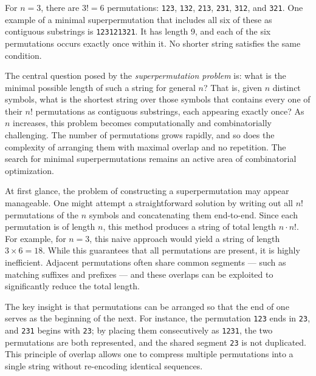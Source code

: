 For $n = 3$, there are $3! = 6$ permutations: \texttt{123}, \texttt{132}, \texttt{213}, \texttt{231}, \texttt{312}, and \texttt{321}. One example of a minimal superpermutation that includes all six of these as contiguous substrings is \texttt{123121321}. It has length 9, and each of the six permutations occurs exactly once within it. No shorter string satisfies the same condition.

The central question posed by the \emph{superpermutation problem} is: what is the minimal possible length of such a string for general $n$? That is, given $n$ distinct symbols, what is the shortest string over those symbols that contains every one of their $n!$ permutations as contiguous substrings, each appearing exactly once? As $n$ increases, this problem becomes computationally and combinatorially challenging. The number of permutations grows rapidly, and so does the complexity of arranging them with maximal overlap and no repetition. The search for minimal superpermutations remains an active area of combinatorial optimization.

At first glance, the problem of constructing a superpermutation may appear manageable. One might attempt a straightforward solution by writing out all $n!$ permutations of the $n$ symbols and concatenating them end-to-end. Since each permutation is of length $n$, this method produces a string of total length $n \cdot n!$. For example, for $n = 3$, this naive approach would yield a string of length $3 \times 6 = 18$. While this guarantees that all permutations are present, it is highly inefficient. Adjacent permutations often share common segments — such as matching suffixes and prefixes — and these overlaps can be exploited to significantly reduce the total length.

The key insight is that permutations can be arranged so that the end of one serves as the beginning of the next. For instance, the permutation \texttt{123} ends in \texttt{23}, and \texttt{231} begins with \texttt{23}; by placing them consecutively as \texttt{1231}, the two permutations are both represented, and the shared segment \texttt{23} is not duplicated. This principle of overlap allows one to compress multiple permutations into a single string without re-encoding identical sequences.

